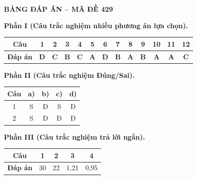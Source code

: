 \vspace{0.4cm}
\noindent\begin{minipage}{\linewidth}
\begin{center}{\large\bfseries\color{red!80!black} BẢNG ĐÁP ÁN -- MÃ ĐỀ 429}\end{center}
\vspace{0.15cm}
\noindent\textbf{Phần I (Câu trắc nghiệm nhiều phương án lựa chọn).}\par\smallskip
\begin{center}
\begin{tabular}{|c|c|c|c|c|c|c|c|c|c|c|c|c|}\hline
\textbf{Câu} & 1 & 2 & 3 & 4 & 5 & 6 & 7 & 8 & 9 & 10 & 11 & 12 \\ \hline
\textbf{Đáp án} & \textbf{D} & \textbf{C} & \textbf{B} & \textbf{C} & \textbf{A} & \textbf{D} & \textbf{B} & \textbf{A} & \textbf{B} & \textbf{A} & \textbf{A} & \textbf{C} \\ \hline
\end{tabular}
\end{center}
\noindent\textbf{Phần II (Câu trắc nghiệm Đúng/Sai).}\par\smallskip
\begin{center}
\begin{tabular}{|c|c|c|c|c|}\hline
\textbf{Câu} & \textbf{a)} & \textbf{b)} & \textbf{c)} & \textbf{d)} \\ \hline
1 & S & Đ & S & Đ \\ \hline
2 & S & Đ & Đ & Đ \\ \hline
\end{tabular}
\end{center}
\noindent\textbf{Phần III (Câu trắc nghiệm trả lời ngắn).}\par\smallskip
\begin{center}
\begin{tabular}{|c|c|c|c|c|}\hline
\textbf{Câu} & 1 & 2 & 3 & 4 \\ \hline
\textbf{Đáp án} & 30 & 22 & 1,21 & 0,95 \\ \hline
\end{tabular}
\end{center}
\end{minipage}
